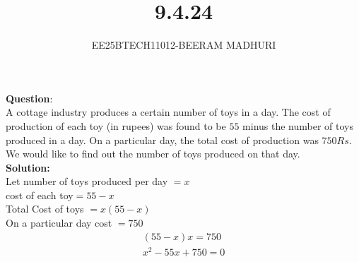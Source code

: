 \documentclass[journal]{IEEEtran}
\begin{document}

\vspace{3cm}

\title{9.4.24}
\author{EE25BTECH11012-BEERAM MADHURI}
{\let\newpage\relax\maketitle}

\renewcommand{\thefigure}{\theenumi}
\renewcommand{\thetable}{\theenumi}
\setlength{\intextsep}{10pt} %


\renewcommand{\thetable}{\theenumi}


\textbf{Question}:\\
A cottage industry produces a certain number of toys in a day. The cost of production of each toy (in rupees) was found to be $55$ minus the number of toys produced in a day. On a particular day, the total cost of production was $750Rs$. We would like to find out the number of toys produced on that day.\\
\textbf{Solution:}\\
Let number of toys produced per day $= x$ \\
cost of each toy$= 55-x$ \\
Total Cost of toys $= x(55-x)$ \\

On a particular day cost $= 750$ 
\begin{align}
(55-x) x = 750 \\
x^2 - 55x + 750 = 0
\end{align}
\end{document}
